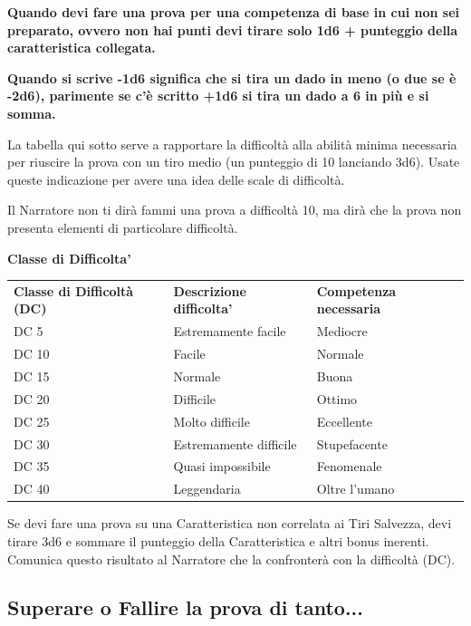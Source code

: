 \documentclass[a4paper,11pt,twoside,openany]{book}
\begin{document}
\bigskip

\textbf{Quando devi fare una prova per una competenza di base in cui non sei preparato, ovvero non hai punti devi tirare solo 1d6 + punteggio della caratteristica collegata.}

\textbf{Quando si scrive -1d6 significa che si tira un dado in meno (o due se è -2d6), parimente se c'è scritto +1d6 si tira un dado a 6 in più e si somma.}

\bigskip

La tabella qui sotto serve a rapportare la difficoltà alla abilità minima necessaria per riuscire la prova con un tiro medio (un punteggio di 10 lanciando 3d6). Usate queste indicazione per avere una idea delle scale di difficoltà.

Il Narratore non ti dirà fammi una prova a difficoltà 10, ma dirà che la prova non presenta elementi di particolare difficoltà.

\bigskip

\textbf{Classe di Difficolta'}
\medskip

\begin{tabular}{lll}
	\toprule
	\textbf{Classe di Difficoltà (DC)} & \textbf{Descrizione difficolta'} & \textbf{ Competenza necessaria}\\
	DC 5               & Estremamente facile              & Mediocre\\
	DC 10              & Facile           & Normale\\
	DC 15              & Normale          & Buona\\
	DC 20              & Difficile        & Ottimo\\
	DC 25              & Molto difficile  & Eccellente\\
	DC 30              & Estremamente difficile           & Stupefacente\\
	DC 35              & Quasi impossibile& Fenomenale\\
	DC 40              & Leggendaria      & Oltre l'umano\\
\end{tabular}

\bigskip

Se devi fare una prova su una Caratteristica non correlata ai Tiri Salvezza, devi tirare 3d6 e sommare il punteggio della Caratteristica e altri bonus inerenti. Comunica questo risultato al Narratore che la confronterà con la difficoltà (DC).

\subsection{Superare o Fallire la prova di tanto...}
\end{document}
